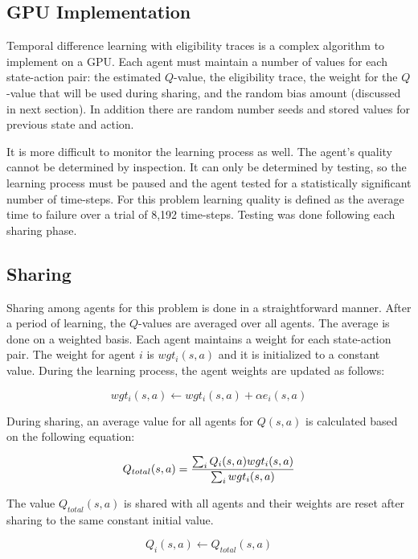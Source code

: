 \subsection{GPU Implementation}
Temporal difference learning with eligibility traces is a complex algorithm to implement on a GPU.  Each agent must maintain a number of values for each state-action pair: the estimated $Q$-value, the eligibility trace, the weight for the $Q$-value that will be used during sharing, and the random bias amount (discussed in next section).   In addition there are random number seeds and stored values for previous state and action.

It is more difficult to monitor the learning process as well.  The agent’s quality cannot be determined by inspection.  It can only be determined by testing, so the learning process must be paused and the agent tested for a statistically significant number of time-steps.  For this problem learning quality is defined as the average time to failure over a trial of 8,192 time-steps.  Testing was done following each sharing phase. 

\subsection{Sharing}
Sharing among agents for this problem is done in a straightforward manner.  After a period of learning, the $Q$-values are averaged over all agents.  The average is done on a weighted basis.  Each agent maintains a weight for each state-action pair.  The weight for agent $i$ is $wgt_i(s,a)$ and it is initialized to a constant value.  During the learning process, the agent weights are updated as follows:

\begin{equation}
wgt_i(s,a) \gets wgt_i(s,a)+\alpha e_i(s,a)
\end{equation}

During sharing, an average value for all agents for $Q(s,a)$ is calculated based on the following equation:

\begin{equation}
Q_{total}(s,a)={ {\sum_iQ_i(s,a)wgt_i(s,a)} \over {\sum_iwgt_i(s,a)} }
\end{equation}

The value $Q_{total}(s,a)$ is shared with all agents and their weights are reset after sharing to the same constant initial value. 

\begin{equation}
Q_i(s,a) \gets Q_{total}(s,a)
\end{equation}

